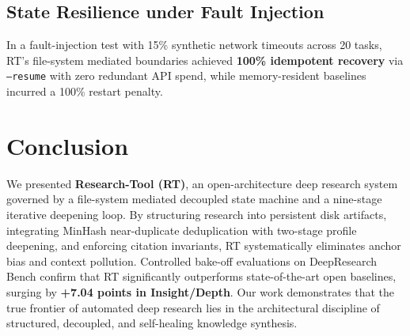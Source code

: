 \documentclass[11pt,a4paper]{article}
\begin{document}
\subsection{State Resilience under Fault Injection}
In a fault-injection test with 15\% synthetic network timeouts across 20 tasks, RT's file-system mediated boundaries achieved \textbf{100\% idempotent recovery} via \texttt{--resume} with zero redundant API spend, while memory-resident baselines incurred a 100\% restart penalty.

\section{Conclusion}

We presented \textbf{Research-Tool (RT)}, an open-architecture deep research system governed by a file-system mediated decoupled state machine and a nine-stage iterative deepening loop. By structuring research into persistent disk artifacts, integrating MinHash near-duplicate deduplication with two-stage profile deepening, and enforcing citation invariants, RT systematically eliminates anchor bias and context pollution. Controlled bake-off evaluations on DeepResearch Bench confirm that RT significantly outperforms state-of-the-art open baselines, surging by \textbf{+7.04 points in Insight/Depth}. Our work demonstrates that the true frontier of automated deep research lies in the architectural discipline of structured, decoupled, and self-healing knowledge synthesis.



\end{document}
